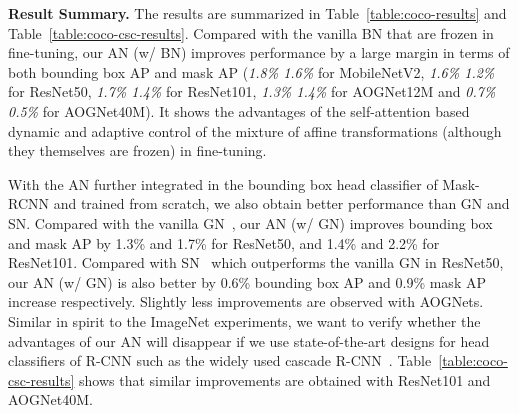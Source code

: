 \documentclass[runningheads]{llncs}
\begin{document}
 \begin{table*} [t]
    \centering
    \small{
    }
\caption{Results in MS-COCO using the cascade variant~\cite{cascadercnn} of Mask R-CNN. 
    }\label{table:coco-csc-results} \end{table*}


\textbf{Result Summary.} The results are summarized in Table~\ref{table:coco-results} and Table~\ref{table:coco-csc-results}. Compared with the vanilla BN that are frozen in fine-tuning, our AN (w/ BN) improves performance by a large margin in terms of both bounding box AP and mask AP (\textit{1.8\%  1.6\%} for MobileNetV2, \textit{1.6\%  1.2\%} for ResNet50, \textit{1.7\%  1.4\%} for ResNet101, \textit{1.3\%  1.4\%} for AOGNet12M and \textit{0.7\%  0.5\%} for AOGNet40M). It shows the advantages of the self-attention based dynamic and adaptive control of the mixture of affine transformations (although they themselves are frozen) in fine-tuning. 

 With the AN further integrated in the bounding box head classifier of Mask-RCNN and trained from scratch, we also obtain better performance than GN and SN. Compared with the vanilla GN~\cite{GroupNorm}, our AN (w/ GN) improves bounding box and mask AP by 1.3\% and 1.7\% for ResNet50, and 1.4\% and 2.2\% for ResNet101. Compared with SN~\cite{SwitchNorm} which outperforms the vanilla GN in ResNet50, our AN (w/ GN) is also better by 0.6\% bounding box AP and 0.9\%  mask AP increase respectively. Slightly less improvements are observed with AOGNets.   
Similar in spirit to the ImageNet experiments, we want to verify whether the advantages of our AN will disappear if we use state-of-the-art designs for head classifiers of R-CNN such as the widely used cascade R-CNN~\cite{cascadercnn}. Table~\ref{table:coco-csc-results} shows that similar improvements are obtained with ResNet101 and AOGNet40M. 
\end{document}
